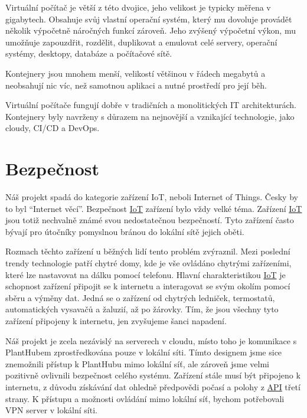 \documentclass[czech,12pt,a4paper]{article}
\begin{document}
Virtuální počítač je větší z této dvojice, jeho velikost je typicky měřena v gigabytech. Obsahuje svůj vlastní operační systém, který mu dovoluje provádět několik výpočetně náročných funkcí zároveň. Jeho zvýšený výpočetní výkon, mu umožňuje zapouzdřit, rozdělit, duplikovat a emulovat celé servery, operační systémy, desktopy, databáze a počítačové sítě.

Kontejnery jsou mnohem menší, velikostí většinou v řádech megabytů a neobsahují nic víc, než samotnou aplikaci a nutné prostředí pro její běh.

Virtuální počítače fungují dobře v tradičních a monolitických IT architekturách. Kontejnery byly navrženy s důrazem na nejnovější a vznikající technologie, jako cloudy, CI/CD a DevOps.

\clearpage

\section{Bezpečnost} \label{secBezpecnost}

Náš projekt spadá do kategorie zařízení \ac{IoT}, neboli Internet of Things. Česky by to byl \enquote{Internet věcí}. Bezpečnost \underline{\ac{IoT}} zařízení bylo vždy velké téma. Zařízení \underline{\ac{IoT}} jsou totiž nechvalně známé svou nedostatečnou bezpečností. Tyto zařízení často bývají pro útočníky pomyslnou bránou do lokální sítě jejich oběti.

Rozmach těchto zařízení u běžných lidí tento problém zvýraznil. Mezi poslední trendy technologie patří chytré domy, kde je vše ovládáno chytrými zařízeními, které lze nastavovat na dálku pomocí telefonu. Hlavní charakteristikou \underline{\ac{IoT}} je schopnost zařízení připojit se k internetu a interagovat se svým okolím pomocí sběru a výměny dat. Jedná se o zařízení od chytrých ledniček, termostatů, automatických vysavačů a žaluzií, až po žárovky. Tím, že jsou všechny tyto zařízení připojeny k internetu, jen zvyšujeme šanci napadení.

Náš projekt je zcela nezávislý na serverech v cloudu, místo toho je komunikace s PlantHubem zprostředkována pouze v lokální síti. Tímto designem jsme sice znemožnili přístup k PlantHubu mimo lokální síť, ale zároveň jsme velmi pozitivně ovlivnili bezpečnost celého systému. Zařízení stále musí být připojeno k internetu, z důvodu získávání dat ohledně předpovědi počasí a polohy z \underline{\ac{API}} třetí strany. K přístupu a možnosti ovládání mimo lokální síť, bychom potřebovali VPN server v lokální síti.
\end{document}
